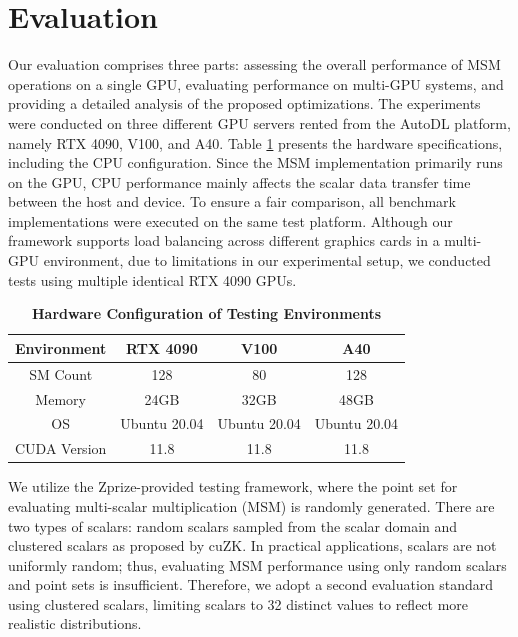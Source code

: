 \documentclass[conference]{IEEEtran}
\begin{document}
\section{Evaluation}
\label{sec:Evaluation}

Our evaluation comprises three parts: assessing the overall performance of MSM operations on a single GPU, evaluating performance on multi-GPU systems, and providing a detailed analysis of the proposed optimizations. The experiments were conducted on three different GPU servers rented from the AutoDL platform, namely RTX 4090, V100, and A40. Table \ref{tab:hardware-config} presents the hardware specifications, including the CPU configuration. Since the MSM implementation primarily runs on the GPU, CPU performance mainly affects the scalar data transfer time between the host and device. To ensure a fair comparison, all benchmark implementations were executed on the same test platform. Although our framework supports load balancing across different graphics cards in a multi-GPU environment, due to limitations in our experimental setup, we conducted tests using multiple identical RTX 4090 GPUs.

\begin{table}[htbp]
    \caption{\textbf{Hardware Configuration of Testing Environments}} %
    \centering
    \begin{tabular}{|c|c|c|c|}
    \hline
    \textbf{Environment} & \textbf{RTX 4090} & \textbf{V100} & \textbf{A40} \\
    \hline
    SM Count & 128 & 80 & 128  \\
    \hline
    Memory & 24GB & 32GB & 48GB  \\
    \hline
    OS & Ubuntu 20.04 & Ubuntu 20.04 & Ubuntu 20.04 \\
    \hline
    CUDA Version & 11.8 & 11.8 & 11.8 \\
    \hline
    \end{tabular}
    \label{tab:hardware-config} %
\end{table}

We utilize the Zprize-provided testing framework, where the point set for evaluating multi-scalar multiplication (MSM) is randomly generated. There are two types of scalars: random scalars sampled from the scalar domain and clustered scalars as proposed by cuZK. In practical applications, scalars are not uniformly random; thus, evaluating MSM performance using only random scalars and point sets is insufficient. Therefore, we adopt a second evaluation standard using clustered scalars, limiting scalars to 32 distinct values to reflect more realistic distributions.
\end{document}

